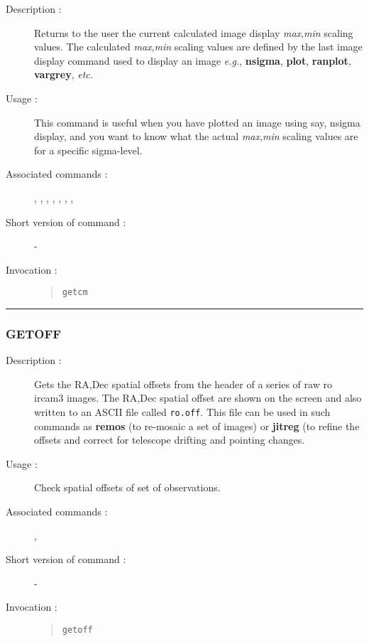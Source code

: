 \begin{description}

\item[Description :] Returns to the user the current calculated image
display {\it max},{\it min} scaling values.  The calculated {\it
max},{\it min} scaling values are defined by the last image display
command used to display an image \emph{e.g.}, {\bf nsigma}, {\bf plot},
{\bf ranplot}, {\bf vargrey}, \emph{etc.}

\item[Usage :] This command is useful when you have plotted an image
using say, nsigma display, and you want to know what the actual {\it
max},{\it min} scaling values are for a specific sigma-level.

\item[Associated commands :] {\tt {}},
{\tt {}}, {\tt {}},
{\tt {}}, {\tt {}},
{\tt {}}, {\tt {}}, \\
{\tt {}}

\item[Short version of command :] -
\item[Invocation :]

\begin{quote}{\tt  getcm }\end{quote}

\end{description}

\hrule
\subsubsection*{\label{GETOFF}GETOFF}

\begin{description}

\item[Description :] Gets the RA,Dec spatial offsets from the header of
a series of raw {\sc ro} {\sc ircam3} images.  The RA,Dec spatial
offset are shown on the screen and also written to an ASCII file called
{\tt ro.off}.  This file can be used in such commands as {\bf remos} (to
re-mosaic a set of images) or {\bf jitreg} (to refine the offsets and correct
for telescope drifting and pointing changes.

\item[Usage :] Check spatial offsets of set of observations.
\item[Associated commands :] {\tt {}},
{\tt {}}
\item[Short version of command :] -
\item[Invocation :]

\begin{quote}{\tt  getoff }\end{quote}

\end{description}


